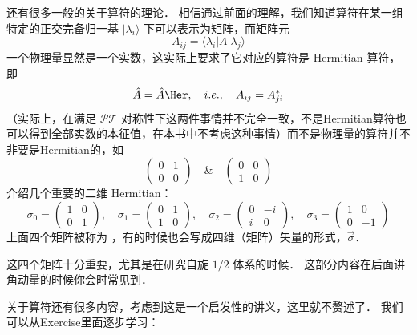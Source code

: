 还有很多一般的关于算符的理论． 相信通过前面的理解，我们知道算符在某一组特定的正交完备归一基 $|\lambda_i\rangle$ 下可以表示为矩阵，而矩阵元
\begin{equation}
A_{ij} = \langle\lambda_i|A|\lambda_j\rangle
\end{equation}
一个物理量显然是一个实数，这实际上要求了它对应的算符是 Hermitian 算符，即
\begin{equation}
\hat{A} = \hat{A}\Her,\quad i.e.,\quad A_{ij} = A_{ji}^*
\end{equation}
（实际上，在满足 $\mathcal{PT}$ 对称性下这两件事情并不完全一致，不是Hermitian算符也可以得到全部实数的本征值，在本书中不考虑这种事情）而不是物理量的算符并不非要是Hermitian的，如
\begin{equation}
\left(\begin{matrix}0 & 1\\0 & 0\end{matrix}\right) \quad \& \quad \left(\begin{matrix}0 & 0\\1 & 0\end{matrix}\right)
\end{equation}
介绍几个重要的二维 Hermitian：
\begin{equation}\label{Basics_eq18}
\sigma_0 = \left(\begin{matrix}1 & 0\\0 & 1\end{matrix}\right),
\quad\sigma_1 = \left(\begin{matrix} 0 & 1\\1 & 0\end{matrix}\right),
\quad\sigma_2 = \left(\begin{matrix} 0 & -i\\i & 0\end{matrix}\right),
\quad\sigma_3 = \left(\begin{matrix} 1 & 0\\0 & -1\end{matrix}\right)  
\end{equation}
上面四个矩阵被称为 ，有的时候也会写成四维（矩阵）矢量的形式，$\vec{\sigma}$．

这四个矩阵十分重要，尤其是在研究自旋 $1/2$ 体系的时候． 这部分内容在后面讲角动量的时候你会时常见到．

关于算符还有很多内容，考虑到这是一个启发性的讲义，这里就不赘述了． 我们可以从Exercise里面逐步学习：

